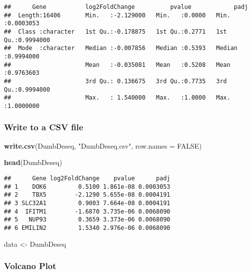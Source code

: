 \documentclass[
]{article}
\newenvironment{Shaded}{\begin{snugshade}}{\end{snugshade}}
\newcommand{\AttributeTok}[1]{\textcolor[rgb]{0.13,0.29,0.53}{#1}}
\newcommand{\ConstantTok}[1]{\textcolor[rgb]{0.56,0.35,0.01}{#1}}
\newcommand{\FunctionTok}[1]{\textcolor[rgb]{0.13,0.29,0.53}{\textbf{#1}}}
\newcommand{\NormalTok}[1]{#1}
\newcommand{\OtherTok}[1]{\textcolor[rgb]{0.56,0.35,0.01}{#1}}
\newcommand{\StringTok}[1]{\textcolor[rgb]{0.31,0.60,0.02}{#1}}
\begin{document}
\begin{verbatim}
##      Gene           log2FoldChange          pvalue            padj          
##  Length:16406       Min.   :-2.129000   Min.   :0.0000   Min.   :0.0003053  
##  Class :character   1st Qu.:-0.178875   1st Qu.:0.2771   1st Qu.:0.9994000  
##  Mode  :character   Median :-0.007856   Median :0.5393   Median :0.9994000  
##                     Mean   :-0.035081   Mean   :0.5208   Mean   :0.9763603  
##                     3rd Qu.: 0.136675   3rd Qu.:0.7735   3rd Qu.:0.9994000  
##                     Max.   : 1.540000   Max.   :1.0000   Max.   :1.0000000
\end{verbatim}

\subsubsection{Write to a CSV file}\label{write-to-a-csv-file}

\begin{Shaded}
\begin{Highlighting}[]
\FunctionTok{write.csv}\NormalTok{(DumbDeseq, }\StringTok{"DumbDeseq.csv"}\NormalTok{, }\AttributeTok{row.names =} \ConstantTok{FALSE}\NormalTok{)}
\end{Highlighting}
\end{Shaded}

\begin{Shaded}
\begin{Highlighting}[]
\FunctionTok{head}\NormalTok{(DumbDeseq)}
\end{Highlighting}
\end{Shaded}

\begin{verbatim}
##      Gene log2FoldChange    pvalue      padj
## 1    DOK6         0.5100 1.861e-08 0.0003053
## 2    TBX5        -2.1290 5.655e-08 0.0004191
## 3 SLC32A1         0.9003 7.664e-08 0.0004191
## 4  IFITM1        -1.6870 3.735e-06 0.0068090
## 5   NUP93         0.3659 3.373e-06 0.0068090
## 6 EMILIN2         1.5340 2.976e-06 0.0068090
\end{verbatim}

\begin{Shaded}
\begin{Highlighting}[]
\NormalTok{data }\OtherTok{\textless{}{-}}\NormalTok{ DumbDeseq}
\end{Highlighting}
\end{Shaded}

\subsubsection{Volcano Plot}\label{volcano-plot}
\end{document}
